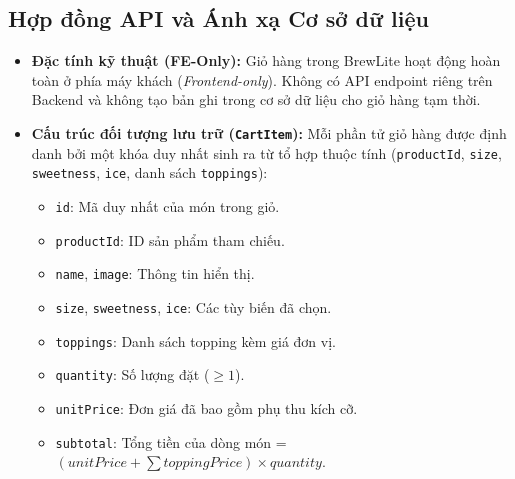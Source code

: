 \documentclass[12pt,a4paper,oneside]{report}
\begin{document}
\subsection{Hợp đồng API và Ánh xạ Cơ sở dữ liệu}
\begin{itemize}
    \item \textbf{Đặc tính kỹ thuật (FE-Only):} Giỏ hàng trong BrewLite hoạt động hoàn toàn ở phía máy khách (\textit{Frontend-only}). Không có API endpoint riêng trên Backend và không tạo bản ghi trong cơ sở dữ liệu cho giỏ hàng tạm thời.
    \item \textbf{Cấu trúc đối tượng lưu trữ (\texttt{CartItem}):}
    Mỗi phần tử giỏ hàng được định danh bởi một khóa duy nhất sinh ra từ tổ hợp thuộc tính (\texttt{productId}, \texttt{size}, \texttt{sweetness}, \texttt{ice}, danh sách \texttt{toppings}):
    \begin{itemize}
        \item \texttt{id}: Mã duy nhất của món trong giỏ.
        \item \texttt{productId}: ID sản phẩm tham chiếu.
        \item \texttt{name}, \texttt{image}: Thông tin hiển thị.
        \item \texttt{size}, \texttt{sweetness}, \texttt{ice}: Các tùy biến đã chọn.
        \item \texttt{toppings}: Danh sách topping kèm giá đơn vị.
        \item \texttt{quantity}: Số lượng đặt (\(\ge 1\)).
        \item \texttt{unitPrice}: Đơn giá đã bao gồm phụ thu kích cỡ.
        \item \texttt{subtotal}: Tổng tiền của dòng món = \((unitPrice + \sum toppingPrice) \times quantity\).
    \end{itemize}
\end{itemize}
\end{document}
